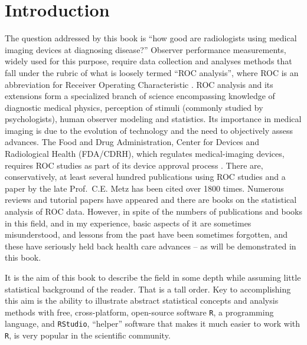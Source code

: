 \documentclass[
]{book}
\begin{document}
\hypertarget{preliminariesIntro}{%
\section{Introduction}\label{preliminariesIntro}}

The question addressed by this book is ``how good are radiologists using medical imaging devices at diagnosing disease?'' Observer performance measurements, widely used for this purpose, require data collection and analyses methods that fall under the rubric of what is loosely termed ``ROC analysis'', where ROC is an abbreviation for Receiver Operating Characteristic \citep{RN1766}. ROC analysis and its extensions form a specialized branch of science encompassing knowledge of diagnostic medical physics, perception of stimuli (commonly studied by psychologists), human observer modeling and statistics. Its importance in medical imaging is due to the evolution of technology and the need to objectively assess advances. The Food and Drug Administration, Center for Devices and Radiological Health (FDA/CDRH), which regulates medical-imaging devices, requires ROC studies as part of its device approval process . There are, conservatively, at least several hundred publications using ROC studies and a paper \citep{RN1766} by the late Prof.~C.E. Metz has been cited over 1800 times. Numerous reviews and tutorial papers have appeared \citep[\citet{RN113}, \citet{RN1908}, \citet{RN1973}]{RN1766} and there are books on the statistical analysis \citep{RN1443} of ROC data. However, in spite of the numbers of publications and books in this field, and in my experience, basic aspects of it are sometimes misunderstood, and lessons from the past have been sometimes forgotten, and these have seriously held back health care advances -- as will be demonstrated in this book.

It is the aim of this book to describe the field in some depth while assuming little statistical background of the reader. That is a tall order. Key to accomplishing this aim is the ability to illustrate abstract statistical concepts and analysis methods with free, cross-platform, open-source software \texttt{R}, a programming language, and \texttt{RStudio}, ``helper'' software that makes it much easier to work with \texttt{R}, is very popular in the scientific community.
\end{document}

